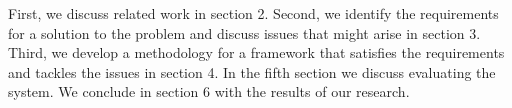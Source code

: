 First, we discuss related work in section 2. Second, we identify the requirements for a solution to the problem and discuss issues that might arise in section 3. Third, we develop a methodology for a framework that satisfies the requirements and tackles the issues in section 4. In the fifth section we discuss evaluating the system. We conclude in section 6 with the results of our research.